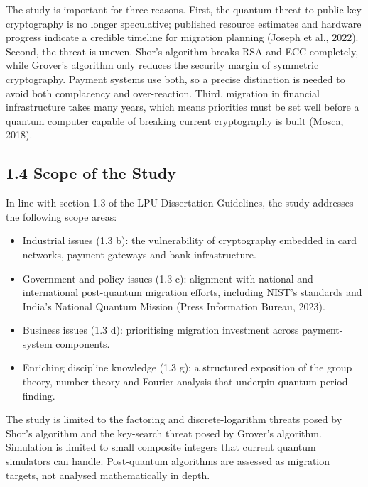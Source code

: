 \documentclass[12pt,oneside]{report}
\begin{document}
The study is important for three reasons. First, the quantum threat to public-key cryptography is no longer speculative; published resource estimates and hardware progress indicate a credible timeline for migration planning (Joseph et al., 2022). Second, the threat is uneven. Shor's algorithm breaks RSA and ECC completely, while Grover's algorithm only reduces the security margin of symmetric cryptography. Payment systems use both, so a precise distinction is needed to avoid both complacency and over-reaction. Third, migration in financial infrastructure takes many years, which means priorities must be set well before a quantum computer capable of breaking current cryptography is built (Mosca, 2018).
\par

\subsection*{1.4 Scope of the Study}

In line with section 1.3 of the LPU Dissertation Guidelines, the study addresses the following scope areas:
\par

\begin{itemize}
  \sloppy
  \item Industrial issues (1.3 b): the vulnerability of cryptography embedded in card networks, payment gateways and bank infrastructure.
  \item Government and policy issues (1.3 c): alignment with national and international post-quantum migration efforts, including NIST's standards and India's National Quantum Mission (Press Information Bureau, 2023).
  \item Business issues (1.3 d): prioritising migration investment across payment-system components.
  \item Enriching discipline knowledge (1.3 g): a structured exposition of the group theory, number theory and Fourier analysis that underpin quantum period finding.
\end{itemize}
\par

The study is limited to the factoring and discrete-logarithm threats posed by Shor's algorithm and the key-search threat posed by Grover's algorithm. Simulation is limited to small composite integers that current quantum simulators can handle. Post-quantum algorithms are assessed as migration targets, not analysed mathematically in depth.
\par
\end{document}
